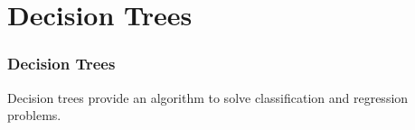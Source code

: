 \section{Decision Trees}
\begin{frame}
\frametitle{Decision Trees}
Decision trees provide an algorithm to solve classification and regression problems.


\end{frame}

